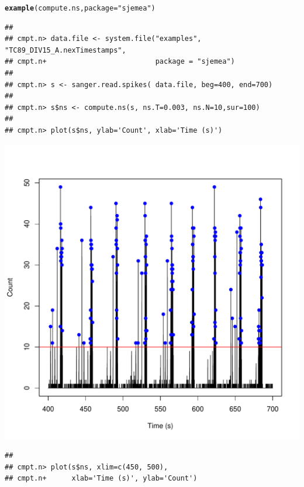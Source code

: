 \documentclass{article}\usepackage[]{graphicx}\usepackage[]{color}
\makeatletter
\def\maxwidth{ %
  \ifdim\Gin@nat@width>\linewidth
    \linewidth
  \else
    \Gin@nat@width
  \fi
}
\newcommand{\hlstr}[1]{\textcolor[rgb]{0.192,0.494,0.8}{#1}}%
\newcommand{\hlstd}[1]{\textcolor[rgb]{0.345,0.345,0.345}{#1}}%
\newcommand{\hlkwc}[1]{\textcolor[rgb]{0.333,0.667,0.333}{#1}}%
\newcommand{\hlkwd}[1]{\textcolor[rgb]{0.737,0.353,0.396}{\textbf{#1}}}%
\newenvironment{kframe}{%
 \def\at@end@of@kframe{}%
 \ifinner\ifhmode%
  \def\at@end@of@kframe{\end{minipage}}%
  \begin{minipage}{\columnwidth}%
 \fi\fi%
 \def\FrameCommand##1{\hskip\@totalleftmargin \hskip-\fboxsep
 \colorbox{shadecolor}{##1}\hskip-\fboxsep
     \hskip-\linewidth \hskip-\@totalleftmargin \hskip\columnwidth}%
 \MakeFramed {\advance\hsize-\width
   \@totalleftmargin\z@ \linewidth\hsize
   \@setminipage}}%
 {\par\unskip\endMakeFramed%
 \at@end@of@kframe}
\newenvironment{knitrout}{}{} %
\makeatother
\begin{document}
\begin{knitrout}
\color{fgcolor}\begin{kframe}
\begin{alltt}
\hlkwd{example}\hlstd{(compute.ns,} \hlkwc{package} \hlstd{=} \hlstr{"sjemea"}\hlstd{)}
\end{alltt}
\begin{verbatim}
## 
## cmpt.n> data.file <- system.file("examples", "TC89_DIV15_A.nexTimestamps",
## cmpt.n+                          package = "sjemea")
## 
## cmpt.n> s <- sanger.read.spikes( data.file, beg=400, end=700)
## 
## cmpt.n> s$ns <- compute.ns(s, ns.T=0.003, ns.N=10,sur=100)
## 
## cmpt.n> plot(s$ns, ylab='Count', xlab='Time (s)')
\end{verbatim}
\end{kframe}
\includegraphics[width=\maxwidth]{figure/unnamed-chunk-21} 
\begin{kframe}\begin{verbatim}
## 
## cmpt.n> plot(s$ns, xlim=c(450, 500),
## cmpt.n+      xlab='Time (s)', ylab='Count')
\end{verbatim}
\end{kframe}

\end{knitrout}
\end{document}
